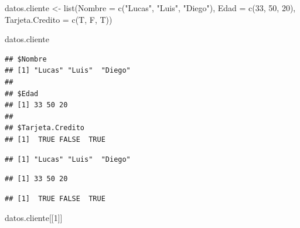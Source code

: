 \documentclass[
  12pt,
]{book}
\newenvironment{Shaded}{\begin{snugshade}}{\end{snugshade}}
\newcommand{\AttributeTok}[1]{\textcolor[rgb]{0.77,0.63,0.00}{#1}}
\newcommand{\DecValTok}[1]{\textcolor[rgb]{0.00,0.00,0.81}{#1}}
\newcommand{\FunctionTok}[1]{\textcolor[rgb]{0.00,0.00,0.00}{#1}}
\newcommand{\NormalTok}[1]{#1}
\newcommand{\OtherTok}[1]{\textcolor[rgb]{0.56,0.35,0.01}{#1}}
\newcommand{\SpecialCharTok}[1]{\textcolor[rgb]{0.00,0.00,0.00}{#1}}
\newcommand{\StringTok}[1]{\textcolor[rgb]{0.31,0.60,0.02}{#1}}
\begin{document}
\begin{Shaded}
\begin{Highlighting}[]
\NormalTok{datos.cliente }\OtherTok{\textless{}{-}} \FunctionTok{list}\NormalTok{(}\AttributeTok{Nombre =} \FunctionTok{c}\NormalTok{(}\StringTok{"Lucas"}\NormalTok{, }\StringTok{"Luis"}\NormalTok{, }\StringTok{"Diego"}\NormalTok{), }\AttributeTok{Edad =} \FunctionTok{c}\NormalTok{(}\DecValTok{33}\NormalTok{, }\DecValTok{50}\NormalTok{, }\DecValTok{20}\NormalTok{), }\AttributeTok{Tarjeta.Credito =} \FunctionTok{c}\NormalTok{(T, F, T))}

\NormalTok{datos.cliente}
\end{Highlighting}
\end{Shaded}

\begin{verbatim}
## $Nombre
## [1] "Lucas" "Luis"  "Diego"
## 
## $Edad
## [1] 33 50 20
## 
## $Tarjeta.Credito
## [1]  TRUE FALSE  TRUE
\end{verbatim}

\begin{Shaded}
\end{Shaded}

\begin{verbatim}
## [1] "Lucas" "Luis"  "Diego"
\end{verbatim}

\begin{Shaded}
\end{Shaded}

\begin{verbatim}
## [1] 33 50 20
\end{verbatim}

\begin{Shaded}
\end{Shaded}

\begin{verbatim}
## [1]  TRUE FALSE  TRUE
\end{verbatim}

\begin{Shaded}
\begin{Highlighting}[]
\NormalTok{datos.cliente[[}\DecValTok{1}\NormalTok{]]}
\end{Highlighting}
\end{Shaded}
\end{document}
